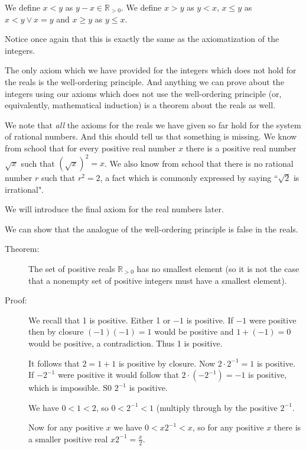 \documentclass[12pt]{article}
\begin{document}
We define $x<y$ as $y-x \in \mathbb R_{>0}$.  We define $x>y$ as $y<x$, $x \leq y$ as $x<y \vee x=y$ and
$x \geq y$ as $y \leq x$.

Notice once again that this is exactly the same as the axiomatization of the integers.

The only axiom which we have provided for the integers which does not hold for the reals is the well-ordering principle.  And anything we can prove about the integers using our axioms which does not use the well-ordering principle (or, equivalently, mathematical induction) is a theorem about the reals as well.

We note that {\em all\/} the axioms for the reals we have given so far hold for the system of rational numbers.  And this should tell us that something is missing.  We know from school that for every positive real number $x$ there is a positive real number $\sqrt x$ such that $(\sqrt x)^2 = x$.  We also know from school that there is no rational number $r$ such that $r^2 = 2$, a fact which is commonly expressed by saying ``$\sqrt 2$ is irrational".

We will introduce the final axiom for the real numbers later.

We can show that the analogue of the well-ordering principle is false in the reals.

\begin{description}

\item[Theorem:]  The set of positive reals $\mathbb R_{>0}$ has no smallest element (so it is not the case that a nonempty set of positive integers must have a smallest element).

\item[Proof:]  We recall that 1 is positive.  Either 1 or $-1$ is positive.  If $-1$ were positive then by closure $(-1)(-1) = 1$ would be positive and $1+(-1) = 0$ would be positive, a contradiction.  Thus 1 is positive.

It follows that $2 =1+1$ is positive by closure.  Now $2\cdot 2^{-1} = 1$ is positive.  If $-2^{-1}$ were positive it would follow that $2\cdot (-2^{-1}) = -1$ is positive, which is impossible.  S0 $2^{-1}$ is positive.

We have $0<1<2$, so $0<2^{-1}<1$ (multiply through by the positive $2^{-1}$.

Now for any positive $x$ we have $0<x2^{-1}<x$, so for any positive $x$ there is a smaller positive real $x2^{-1} = \frac x2$.

\end{description}
\end{document}
